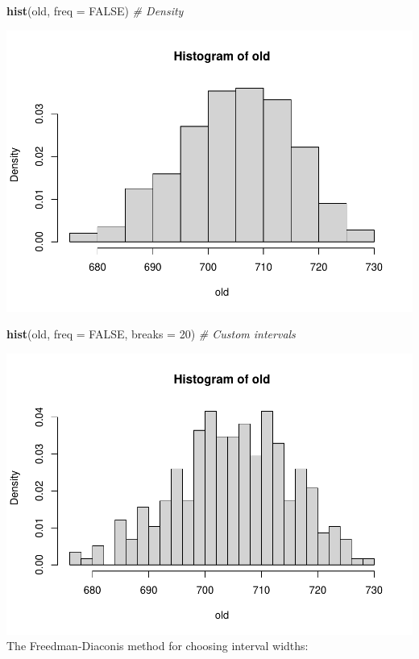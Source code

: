 \documentclass[
]{article}
\newenvironment{Shaded}{\begin{snugshade}}{\end{snugshade}}
\newcommand{\AttributeTok}[1]{\textcolor[rgb]{0.13,0.29,0.53}{#1}}
\newcommand{\CommentTok}[1]{\textcolor[rgb]{0.56,0.35,0.01}{\textit{#1}}}
\newcommand{\ConstantTok}[1]{\textcolor[rgb]{0.56,0.35,0.01}{#1}}
\newcommand{\DecValTok}[1]{\textcolor[rgb]{0.00,0.00,0.81}{#1}}
\newcommand{\FunctionTok}[1]{\textcolor[rgb]{0.13,0.29,0.53}{\textbf{#1}}}
\newcommand{\NormalTok}[1]{#1}
\begin{document}
\begin{Shaded}
\begin{Highlighting}[]
\FunctionTok{hist}\NormalTok{(old, }\AttributeTok{freq =} \ConstantTok{FALSE}\NormalTok{)  }\CommentTok{\# Density}
\end{Highlighting}
\end{Shaded}

\includegraphics{EDA_files/figure-latex/unnamed-chunk-16-2.pdf}

\begin{Shaded}
\begin{Highlighting}[]
\FunctionTok{hist}\NormalTok{(old, }\AttributeTok{freq =} \ConstantTok{FALSE}\NormalTok{, }\AttributeTok{breaks =} \DecValTok{20}\NormalTok{)  }\CommentTok{\# Custom intervals}
\end{Highlighting}
\end{Shaded}

\includegraphics{EDA_files/figure-latex/unnamed-chunk-16-3.pdf} The
Freedman-Diaconis method for choosing interval widths:
\end{document}
